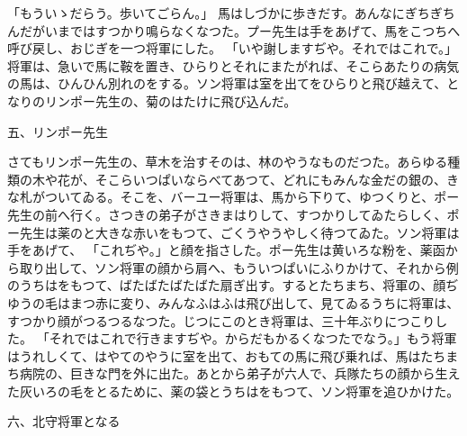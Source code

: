 \documentclass[a4paper,
tate,
book]
{jlreq}
\begin{document}
「もういゝだらう。歩いてごらん。」
  馬はしづかに歩きだす。あんなにぎちぎちんだがいまではすつかり鳴らなくなつた。プー先生は手をあげて、馬をこつちへ呼び戻し、おじぎを一つ将軍にした。
「いや謝しますぢや。それではこれで。」将軍は、急いで馬に鞍を置き、ひらりとそれにまたがれば、そこらあたりの病気の馬は、ひんひん別れのをする。ソン将軍は室を出てをひらりと飛び越えて、となりのリンポー先生の、菊のはたけに飛び込んだ。

            五、リンポー先生

  さてもリンポー先生の、草木を治すそのは、林のやうなものだつた。あらゆる種類の木や花が、そこらいつぱいならべてあつて、どれにもみんな金だの銀の、きな札がついてゐる。そこを、バーユー将軍は、馬から下りて、ゆつくりと、ポー先生の前へ行く。さつきの弟子がさきまはりして、すつかりしてゐたらしく、ポー先生は薬のと大きな赤いをもつて、ごくうやうやしく待つてゐた。ソン将軍は手をあげて、
「これぢや。」と顔を指さした。ポー先生は黄いろな粉を、薬函から取り出して、ソン将軍の顔から肩へ、もういつぱいにふりかけて、それから例のうちはをもつて、ばたばたばたばた扇ぎ出す。するとたちまち、将軍の、顔ぢゆうの毛はまつ赤に変り、みんなふはふは飛び出して、見てゐるうちに将軍は、すつかり顔がつるつるなつた。じつにこのとき将軍は、三十年ぶりにつこりした。
「それではこれで行きますぢや。からだもかるくなつたでなう。」もう将軍はうれしくて、はやてのやうに室を出て、おもての馬に飛び乗れば、馬はたちまち病院の、巨きな門を外に出た。あとから弟子が六人で、兵隊たちの顔から生えた灰いろの毛をとるために、薬の袋とうちはをもつて、ソン将軍を追ひかけた。

            六、北守将軍となる
\end{document}
